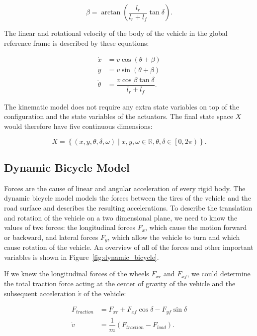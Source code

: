 \begin{equation*}
	\beta=\arctan\left(\dfrac{l_r}{l_r+l_f}\tan\delta\right).
\end{equation*}

The linear and rotational velocity of the body of the vehicle in the global reference frame is described by these equations:

\begin{equation*}
\begin{aligned}
\dot{x}&=v\cos\left(\theta + \beta\right) \\
\dot{y}&=v\sin\left(\theta + \beta\right) \\
\dot{\theta}&=\dfrac{v\cos\beta\tan\delta}{l_r + l_f}.
\end{aligned}
\end{equation*}

The kinematic model does not require any extra state variables on top of the configuration and the state variables of the actuators. The final state space $X$ would therefore have five continuous dimensions:

\begin{equation*}
	X=\left\{\left(x,y,\theta,\delta,\omega\right)\mid x,y,\omega\in\mathbb{R}, \theta,\delta\in\left[0, 2\pi\right)\right\}.
\end{equation*}

\subsection{Dynamic Bicycle Model}

Forces are the cause of linear and angular acceleration of every rigid body. The dynamic bicycle model models the forces between the tires of the vehicle and the road surface and describes the resulting accelerations. To describe the translation and rotation of the vehicle on a two dimensional plane, we need to know the values of two forces: the longitudinal forces $F_x$, which cause the motion forward or backward, and lateral forces $F_y$, which allow the vehicle to turn and which cause rotation of the vehicle. An overview of all of the forces and other important variables is shown in Figure~\ref{fig:dynamic_bicycle}.

If we knew the longitudinal forces of the wheels $F_{xr}$ and $F_{xf}$, we could determine the total traction force acting at the center of gravity of the vehicle and the subsequent acceleration $\dot{v}$ of the vehicle:

\begin{equation*}
\begin{aligned}
F_{traction}&=F_{xr}+F_{xf}\cos\delta-F_{yf}\sin\delta \\
\dot{v}&=\dfrac{1}{m}\left(F_{traction}-F_{load}\right).
\end{aligned}
\end{equation*}

